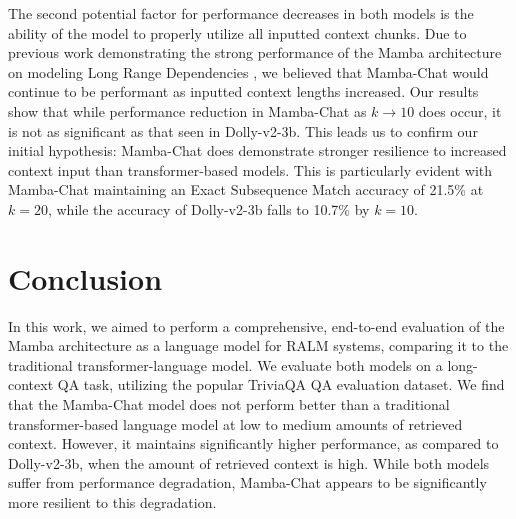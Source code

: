 \documentclass[11pt]{article}
\begin{document}
The second potential factor for performance decreases in both models is the ability of the model to properly utilize all inputted context chunks. Due to previous work demonstrating the strong performance of the Mamba architecture on modeling Long Range Dependencies \cite{gu2023mamba}, we believed that Mamba-Chat would continue to be performant as inputted context lengths increased. Our results show that while performance reduction in Mamba-Chat as $k \to 10$ does occur, it is not as significant as that seen in Dolly-v2-3b. This leads us to confirm our initial hypothesis: Mamba-Chat does demonstrate stronger resilience to increased context input than transformer-based models. This is particularly evident with Mamba-Chat maintaining an Exact Subsequence Match accuracy of 21.5\% at $k=20$, while the accuracy of Dolly-v2-3b falls to 10.7\% by $k=10$. 
\section{Conclusion}
In this work, we aimed to perform a comprehensive, end-to-end evaluation of the Mamba architecture as a language model for RALM systems, comparing it to the traditional transformer-language model. We evaluate both models on a long-context QA task, utilizing the popular TriviaQA QA evaluation dataset. We find that the Mamba-Chat model does not perform better than a traditional transformer-based language model at low to medium amounts of retrieved context. However, it maintains significantly higher performance, as compared to Dolly-v2-3b, when the amount of retrieved context is high. While both models suffer from performance degradation, Mamba-Chat appears to be significantly more resilient to this degradation.
\end{document}

